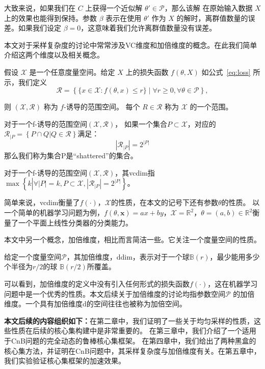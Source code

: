 大致来说，如果我们在 $C$ 上获得一个近似解 $\theta' \in \mathcal{P}$，那么该解
在原始输入数据 $X$ 上的效果也能得到保持。参数 $\beta$ 表示在使用 $\theta'$ 作为 $X$ 的解时，离群值数量的误
差。如果我们设定 $\beta = 0$，这意味着我们允许离群值数量没有误差。

本文对于采样复杂度的讨论中常常涉及VC维度和加倍维度的概念。在此我们简单介绍这两个维度以及相关概念。

\begin{definition}[f-诱导的范围空间]
  假设 $\mathcal{X}$ 是一个任意度量空间。给定 $X$ 上的损失函数 $f(\theta, X)$ 如公式~\eqref{eq:loss} 所示，我们定义
  \begin{equation}
  \mathcal{R} = \left\{ \{ x \in \mathcal{X} : f(\theta, x) \leq r \} \mid \forall r \geq 0, \forall \theta \in \mathcal{P} \right\},
  \end{equation}

则 $(\mathcal{X}, \mathcal{R})$ 称为 $f$-诱导的范围空间。
每个 $R \in \mathcal{R}$ 称为 $\mathcal{X}$ 的一个范围。
\end{definition}

\begin{definition}
  对于一个f-诱导的范围空间$(\mathcal{X},\mathcal{R})$，
  如果一个集合$P\subset \mathcal{X}$，对应的$\mathcal{R}_{|P}=\left\{P\cap Q|Q\in \mathcal{R}\right\}$满足：
  \begin{equation*}
    |\mathcal{R}_{|P}|=2^{|P|}
  \end{equation*}
  那么我们称为集合P是“shattered”的集合。
\end{definition}
\begin{definition}[VC dimension]
  对于一个f-诱导的范围空间$(\mathcal{X},\mathcal{R})$，其vcdim指$\max\left\{k\left.\right|\forall |P|=k,P\subset \mathcal{X},|\mathcal{R}_{|P}|=2^{|P|}\right\}$。
\end{definition}

简单来说，vcdim衡量了$f(\cdot)$，$\mathcal{X}$的性质，在本文的记号下还有参数$\theta$的性质。
以一个简单的机器学习问题为例，$f(\theta,\mathbf{x})=ax+by$，$\mathcal{X}=\mathbb{R}^2$，$\theta=(a,b)\in \mathbb{R}^2$衡量了一个平面上线性分类器的分类能力。

本文中另一个概念，加倍维度\cite{DBLP:journals/talg/ChanGMZ16}，相比而言简洁一些。它关注一个度量空间的性质。

\begin{definition}
  给定一个度量空间$\mathcal{P}$，其加倍维度，ddim，表示对于一个球$\mathbb{B}(r)$，最少能用多少个半径为$r/2$的球
  $\mathbb{B}(r/2)$所覆盖。
\end{definition}

可以看到，加倍维度的定义中没有引入任何形式的损失函数$f(\cdot)$，这在机器学习问题中是一个优秀的性质。本文后续关于加倍维度的讨论均指参数空间$\mathcal{P}$
的加倍维度。一个具有加倍维度d的空间往往也被称为加倍空间。

\textbf{本文后续的内容组织如下：}在第二章中，我们证明了一些关于均匀采样的性质，这些性质在后续的核心集构建中是非常重要的。
在第三章中，我们介绍了一个适用于CnB问题的完全动态的鲁棒核心集框架。
在第四章中，我们给出了两种黑盒的核心集方法，并证明在CnB问题中，其采样复杂度与加倍维度有关。在第五章中，我们实验验证核心集框架的加速效果。